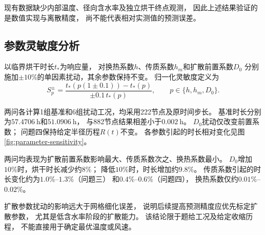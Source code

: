 现有数据缺少内部温度、径向含水率及独立烘干终点观测，
因此上述结果验证的是数值实现与离散精度，
尚不能代表相对实测值的预测误差。

\subsection{参数灵敏度分析}
\label{sec:sensitivity}

以临界烘干时长$t_*$为响应量，
对换热系数$h$、传质系数$h_m$和扩散前置系数$D_0$
分别施加$\pm10\%$的单因素扰动，其余参数保持不变。
归一化灵敏度定义为
\begin{equation}
  S_p^{\pm}
    =\frac{t_*\!\left(p(1\pm0.1)\right)-t_*(p)}
      {\pm0.1\,t_*(p)},
  \qquad p\in\{h,h_m,D_0\}.
  \label{eq:parameter-sensitivity}
\end{equation}

两问各计算1组基准和6组扰动工况，均采用222节点及原时间步长。
基准时长分别为$57.4706\ \mathrm{h}$和$51.0906\ \mathrm{h}$，
与882节点结果相差小于$0.002\ \mathrm{h}$。
$D_0$扰动仅改变前置系数；
问题四保持给定半径历程$R(t)$不变。
各参数引起的时长相对变化见图\ref{fig:parameter-sensitivity}。


两问均表现为扩散前置系数影响最大、传质系数次之、换热系数最小。
$D_0$增加$10\%$时，烘干时长减少约$8\%$；
降低$10\%$时，时长增加约$9.8\%$。
传质系数引起的时长变化约为$1.0\%$--$1.3\%$（问题三）
和$0.4\%$--$0.6\%$（问题四），
换热系数仅约$0.01\%$--$0.02\%$。

扩散参数扰动的影响远大于网格细化误差，
说明后续提高预测精度应优先标定扩散参数，
尤其是低含水率阶段的扩散能力。
该结论限于题给工况及给定收缩历程，
不能直接用于确定最优温度或风速。
